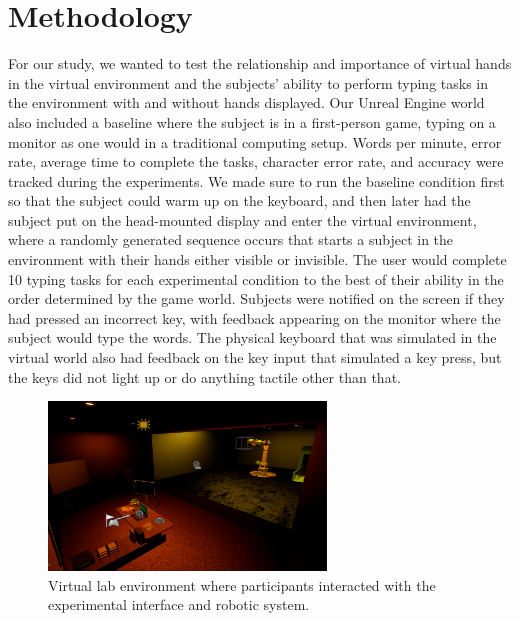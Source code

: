 \documentclass[acmlarge]{acmart}
\begin{document}
\section{Methodology}

For our study, we wanted to test the relationship and importance of virtual hands in the virtual environment and the subjects' ability to perform typing tasks in the environment with and without hands displayed. Our Unreal Engine world also included a baseline where the subject is in a first-person game, typing on a monitor as one would in a traditional computing setup. Words per minute, error rate, average time to complete the tasks, character error rate, and accuracy were tracked during the experiments. We made sure to run the baseline condition first so that the subject could warm up on the keyboard, and then later had the subject put on the head-mounted display and enter the virtual environment, where a randomly generated sequence occurs that starts a subject in the environment with their hands either visible or invisible. The user would complete 10 typing tasks for each experimental condition to the best of their ability in the order determined by the game world. Subjects were notified on the screen if they had pressed an incorrect key, with feedback appearing on the monitor where the subject would type the words. The physical keyboard that was simulated in the virtual world also had feedback on the key input that simulated a key press, but the keys did not light up or do anything tactile other than that.

\begin{figure}[H]
    \centering
    \includegraphics[height=4.5cm]{world_image.png}
    \caption{Virtual lab environment where participants interacted with the experimental interface and robotic system.}
    \label{fig:world_environment}
\end{figure}
\end{document}
